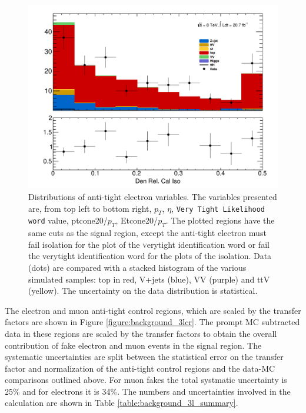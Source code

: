 \begin{figure}[!htbp]
\begin{minipage}[h]{0.5\textwidth}
    \centering \includegraphics[width=\textwidth]{figs/fake/aux_d1_Obj0EtIso20Rel}
  \end{minipage}\hfill
  \caption{Distributions of anti-tight electron variables. The variables presented are, from top left to bottom right, $p_T$, $\eta$, {\tt Very Tight Likelihood word} value, ptcone20/$p_T$, Etcone20/$p_T$. The plotted regions have the same cuts as the signal region, except the anti-tight electron must fail isolation for the plot of the {\textsc verytight} identification word or fail the {verytight} identification word for the plots of the isolation. Data (dots) are compared with a stacked histogram of the various simulated samples: top in red, V+jets (blue), VV (purple) and ttV (yellow). The uncertainty on the data distribution is statistical. }   
  \label{figure:background_electron_dataMC}
\end{figure} 
%

The electron and muon anti-tight control regions, which are scaled by the transfer factors are shown in Figure \ref{figure:background_3lcr}. The prompt MC subtracted data in these regions are scaled by the transfer factors to obtain the overall contribution of fake electron and muon events in the signal region. The systematic uncertainties are split between the statistical error on the transfer factor and normalization of the anti-tight control regions and the data-MC comparisons outlined above. For muon fakes the total systmatic uncertainty is 25\% and for electrons it is 34\%. The numbers and uncertainties involved in the calculation are shown in Table \ref{table:background_3l_summary}.  


